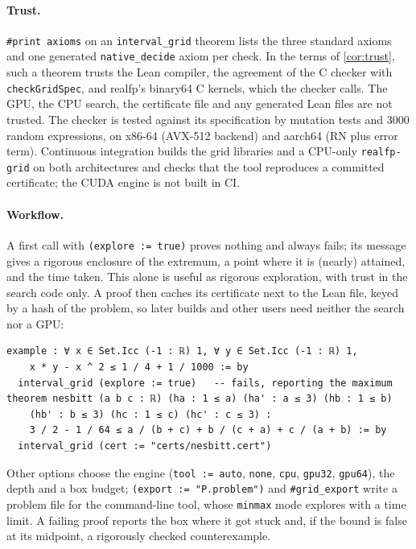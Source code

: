 \documentclass[11pt]{article}
\theoremstyle{definition}
\theoremstyle{remark}
\newcommand{\lean}[1]{\texttt{#1}}
\newcommand{\realfp}{\textsf{realfp}}
\begin{document}
\paragraph{Trust.} \lean{\#print axioms} on an \lean{interval\_grid} theorem
lists the three standard axioms and one generated \lean{native\_decide}
axiom per check. In the terms of \cref{cor:trust}, such a theorem trusts the
Lean compiler, the agreement of the C checker with \lean{checkGridSpec}, and
\realfp{}'s binary64 C kernels, which the checker calls. The GPU, the CPU
search, the certificate file and any generated Lean files are not trusted.
The checker is tested against its specification by mutation tests and
3000 random expressions, on x86-64 (AVX-512 backend) and aarch64 (RN plus
error term). Continuous integration builds the grid libraries and a CPU-only
\lean{realfp-grid} on both architectures and checks that the tool
reproduces a committed certificate; the CUDA engine is not built in CI.

\paragraph{Workflow.} A first call with \lean{(explore := true)} proves
nothing and always fails; its message gives a rigorous enclosure of the
extremum, a point where it is (nearly) attained, and the time taken. This
alone is useful as rigorous exploration, with trust in the search code
only. A proof then caches its certificate next to the Lean file, keyed by a
hash of the problem, so later builds and other users need neither the
search nor a GPU:
\begin{lstlisting}
example : ∀ x ∈ Set.Icc (-1 : ℝ) 1, ∀ y ∈ Set.Icc (-1 : ℝ) 1,
    x * y - x ^ 2 ≤ 1 / 4 + 1 / 1000 := by
  interval_grid (explore := true)   -- fails, reporting the maximum
theorem nesbitt (a b c : ℝ) (ha : 1 ≤ a) (ha' : a ≤ 3) (hb : 1 ≤ b)
    (hb' : b ≤ 3) (hc : 1 ≤ c) (hc' : c ≤ 3) :
    3 / 2 - 1 / 64 ≤ a / (b + c) + b / (c + a) + c / (a + b) := by
  interval_grid (cert := "certs/nesbitt.cert")
\end{lstlisting}
Other options choose the engine (\lean{tool := auto}, \lean{none},
\lean{cpu}, \lean{gpu32}, \lean{gpu64}), the depth and a box budget;
\lean{(export := "P.problem")} and \lean{\#grid\_export} write a problem file
for the command-line tool, whose \lean{minmax} mode explores with a time
limit. A failing proof reports the box where it got stuck and, if the bound
is false at its midpoint, a rigorously checked counterexample.
\end{document}
